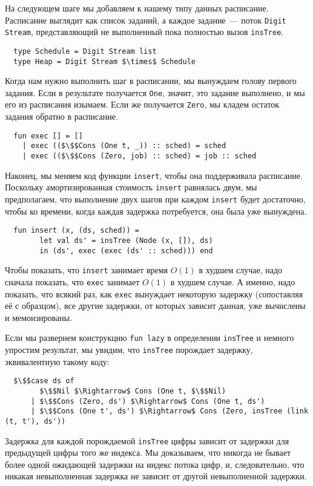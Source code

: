 На следующем шаге мы добавляем к нашему типу данных
расписание. Расписание выглядит как список заданий, а каждое
задание~--- поток \lstinline!Digit Stream!, представляющий
не выполненный пока полностью вызов \lstinline!insTree!.
\begin{lstlisting}
  type Schedule = Digit Stream list
  type Heap = Digit Stream $\times$ Schedule
\end{lstlisting}
Когда нам нужно выполнить шаг в расписании, мы вынуждаем голову
первого задания. Если в результате получается \lstinline!One!, значит,
это задание выполнено, и мы его из расписания изымаем. Если же
получается \lstinline!Zero!, мы кладем остаток задания обратно в
расписание.
\begin{lstlisting}
  fun exec [] = []
    | exec (($\$$Cons (One t, _)) :: sched) = sched
    | exec (($\$$Cons (Zero, job) :: sched) = job :: sched
\end{lstlisting}
Наконец, мы меняем код функции \lstinline!insert!, чтобы она
поддерживала расписание. Поскольку амортизированная стоимость
\lstinline!insert! равнялась двум, мы предполагаем, что выполнение двух
шагов при каждом \lstinline!insert! будет достаточно, чтобы ко
времени, когда каждая задержка потребуется, она была уже вынуждена.
\begin{lstlisting}
  fun insert (x, (ds, sched)) =
        let val ds' = insTree (Node (x, []), ds)
        in (ds', exec (exec (ds' :: sched))) end
\end{lstlisting}
Чтобы показать, что \lstinline!insert! занимает время $O(1)$ в худшем
случае, надо сначала показать, что \lstinline!exec! занимает $O(1)$ в
худшем случае. А именно, надо показать, что всякий раз, как
\lstinline!exec! вынуждает некоторую задержку (сопоставляя её с
образцом), все другие задержки, от которых зависит данная, уже
вычислены и мемоизированы.

Если мы развернем конструкцию \lstinline!fun lazy! в определении
\lstinline!insTree! и немного упростим результат, мы увидим, что
\lstinline!insTree! порождает задержку, эквивалентную такому коду:
\begin{lstlisting}
  $\$$case ds of
        $\$$Nil $\Rightarrow$ Cons (One t, $\$$Nil)
      | $\$$Cons (Zero, ds') $\Rightarrow$ Cons (One t, ds')
      | $\$$Cons (One t', ds') $\Rightarrow$ Cons (Zero, insTree (link (t, t'), ds'))
\end{lstlisting}
Задержка для каждой порождаемой \lstinline!insTree! цифры зависит от
задержки для предыдущей цифры того же индекса. Мы доказываем, что
никогда не бывает более одной ожидающей задержки на индекс потока
цифр, и, следовательно, что никакая невыполненная задержка не зависит
от другой невыполненной задержки.

